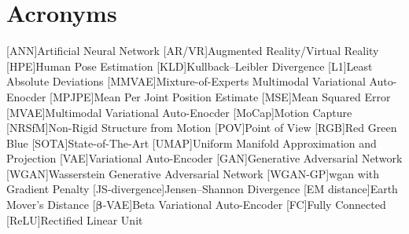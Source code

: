 \chapter*{Acronyms}

\begin{acronym}[TBD]
    [ANN]{Artificial Neural Network}
    [AR/VR]{Augmented Reality/Virtual Reality}
    [HPE]{Human Pose Estimation}
    [KLD]{Kullback–Leibler Divergence}
    [L1]{Least Absolute Deviations}
    [MMVAE]{Mixture-of-Experts Multimodal Variational Auto-Enocder}
    [MPJPE]{Mean Per Joint Position Estimate}
    [MSE]{Mean Squared Error}
    [MVAE]{Multimodal Variational Auto-Enocder}
    [MoCap]{Motion Capture}
    [NRSfM]{Non-Rigid Structure from Motion}
    [POV]{Point of View}
    [RGB]{Red Green Blue}
    [SOTA]{State-of-The-Art}
    [UMAP]{Uniform Manifold Approximation and Projection}
    [VAE]{Variational Auto-Encoder}
    [GAN]{Generative Adversarial Network}
    [WGAN]{Wasserstein Generative Adversarial Network}
    [WGAN-GP]{\ac{wgan} with Gradient Penalty}
    [JS-divergence]{Jensen–Shannon Divergence}
    [EM distance]{Earth Mover's Distance}
    [$\boldsymbol{\beta}$-VAE]{Beta Variational Auto-Encoder}
    [FC]{Fully Connected}
    [ReLU]{Rectified Linear Unit}
    
\end{acronym}

